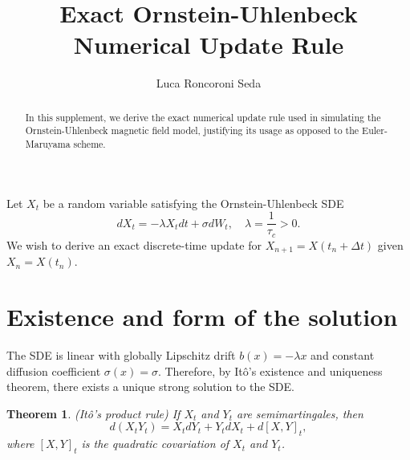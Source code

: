 \documentclass[12pt,reqno]{amsart}
\title{Exact Ornstein-Uhlenbeck Numerical Update Rule}
\author{Luca Roncoroni Seda}
\theoremstyle{plain}
\newtheorem{theorem}{Theorem}
\begin{document}
\begin{abstract}
    In this supplement, we derive the exact numerical update rule used in simulating the Ornstein-Uhlenbeck magnetic field model, justifying its usage as opposed to the Euler-Maruyama scheme.
\end{abstract}

\maketitle

Let $X_t$ be a random variable satisfying the Ornstein-Uhlenbeck SDE
\begin{equation*}
    dX_t = -\lambda X_t dt + \sigma dW_t, \quad \lambda = \frac{1}{\tau_c} > 0.
\end{equation*}
We wish to derive an exact discrete-time update for $X_{n+1} = X(t_n+\Delta t)$ given $X_n = X(t_n)$.

\section{Existence and form of the solution}
The SDE is linear with globally Lipschitz drift $b(x) = -\lambda x$ and constant diffusion coefficient $\sigma(x) = \sigma$. Therefore, by Itô's existence and uniqueness theorem, there exists a unique strong solution to the SDE.

\begin{theorem}{(Itô's product rule)}
    If $X_t$ and $Y_t$ are semimartingales, then
    \begin{equation*}
        d(X_t Y_t) = X_{t} dY_t + Y_{t} dX_t + d[X,Y]_t,
    \end{equation*}
    where $[X,Y]_t$ is the quadratic covariation of $X_t$ and $Y_t$.
    \label{thm:product_rule}
\end{theorem}
\end{document}
